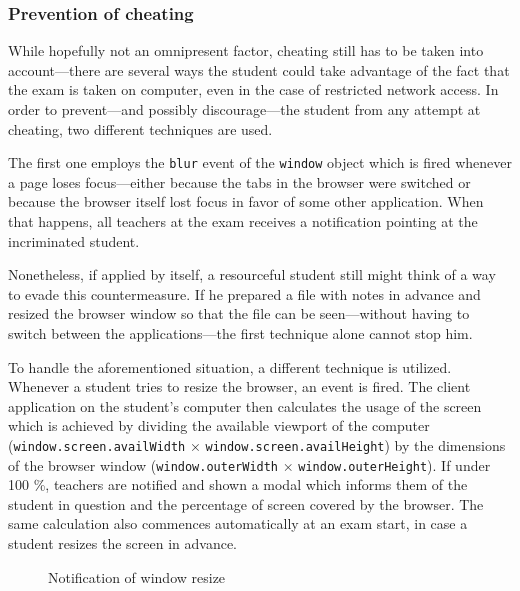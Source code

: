 \documentclass[thesis=M,english,hidelinks]{FITthesis}[2012/10/20]
\newcommand{\code}{\texttt}
\begin{document}
      \subsubsection{Prevention of cheating}

While hopefully not an omnipresent factor, cheating still has to be taken into account---there are several ways the student could take advantage of the fact that the exam is taken on computer, even in the case of restricted network access. In order to prevent---and possibly discourage---the student from any attempt at cheating, two different techniques are used.

The first one employs the \code{blur} event of the \code{window} object which is fired whenever a page loses focus---either because the tabs in the browser were switched or because the browser itself lost focus in favor of some other application. When that happens, all teachers at the exam receives a notification pointing at the incriminated student.

Nonetheless, if applied by itself, a resourceful student still might think of a way to evade this countermeasure. If he prepared a file with notes in advance and resized the browser window so that the file can be seen---without having to switch between the applications---the first technique alone cannot stop him.

To handle the aforementioned situation, a different technique is utilized. Whenever a student tries to resize the browser, an event is fired. The client application on the student's computer then calculates the usage of the screen which is achieved by dividing the available viewport of the computer (\code{window.screen.availWidth} × \code{window.screen.availHeight}) by the dimensions of the browser window (\code{window.outerWidth} × \code{window.outerHeight}). If under 100 \%, teachers are notified and shown a modal which informs them of the student in question and the percentage of screen covered by the browser. The same calculation also commences automatically at an exam start, in case a student resizes the screen in advance.

\begin{figure}
  \setlength\fboxsep{0pt}
  \setlength\fboxrule{0.2pt}
  \caption{Notification of window resize}
  \label{fig:cheating}
\end{figure}
\end{document}

